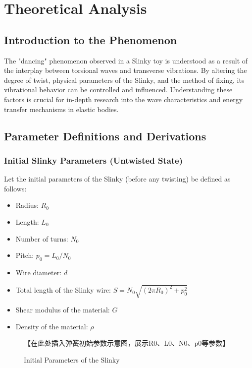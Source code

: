 \documentclass{mcmthesis}  %
\begin{document}
\section{Theoretical Analysis} %

\subsection{Introduction to the Phenomenon}
The "dancing" phenomenon observed in a Slinky toy is understood as a result of the interplay between torsional waves and transverse vibrations. By altering the degree of twist, physical parameters of the Slinky, and the method of fixing, its vibrational behavior can be controlled and influenced. Understanding these factors is crucial for in-depth research into the wave characteristics and energy transfer mechanisms in elastic bodies.

\subsection{Parameter Definitions and Derivations}

\subsubsection{Initial Slinky Parameters (Untwisted State)}
Let the initial parameters of the Slinky (before any twisting) be defined as follows:
\begin{itemize}
    \item Radius: \(R_0\)
    \item Length: \(L_0\)
    \item Number of turns: \(N_0\)
    \item Pitch: \(p_0 = L_0 / N_0\)
    \item Wire diameter: \(d\)
    \item Total length of the Slinky wire: \(S = N_0 \sqrt{(2\pi R_0)^2 + p_0^2}\)
    \item Shear modulus of the material: \(G\)
    \item Density of the material: \(\rho\)
\end{itemize}

\begin{figure}[h!]
    \centering
    【在此处插入弹簧初始参数示意图，展示R0、L0、N0、p0等参数】
    \caption{Initial Parameters of the Slinky}
    \label{fig:initial_params}
\end{figure}
\end{document}

